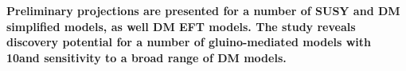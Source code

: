 {\bf
Preliminary projections are presented for a number of SUSY and DM
simplified models, as well DM EFT models. The study reveals discovery
potential for a number of gluino-mediated models with 10\fbinv and
sensitivity to a broad range of DM models.
}



